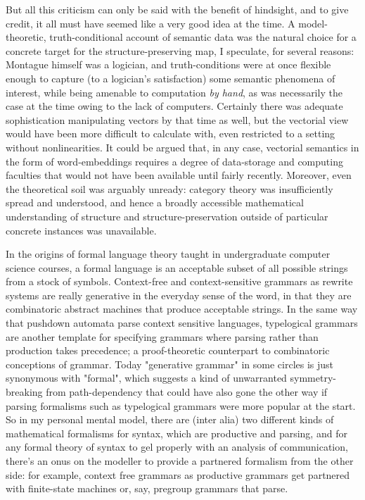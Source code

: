 But all this criticism can only be said with the benefit of hindsight, and to give credit, it all must have seemed like a very good idea at the time. A model-theoretic, truth-conditional account of semantic data was the natural choice for a concrete target for the structure-preserving map, I speculate, for several reasons: Montague himself was a logician, and truth-conditions were at once flexible enough to capture (to a logician's satisfaction) some semantic phenomena of interest, while being amenable to computation \emph{by hand}, as was necessarily the case at the time owing to the lack of computers. Certainly there was adequate sophistication manipulating vectors by that time as well, but the vectorial view would have been more difficult to calculate with, even restricted to a setting without nonlinearities. It could be argued that, in any case, vectorial semantics in the form of word-embeddings requires a degree of data-storage and computing faculties that would not have been available until fairly recently. Moreover, even the theoretical soil was arguably unready: category theory was insufficiently spread and understood, and hence a broadly accessible mathematical understanding of structure and structure-preservation outside of particular concrete instances was unavailable.


In the origins of formal language theory taught in undergraduate computer science courses, a formal language is an acceptable subset of all possible strings from a stock of symbols. Context-free and context-sensitive grammars as rewrite systems are really generative in the everyday sense of the word, in that they are combinatoric abstract machines that produce acceptable strings. In the same way that pushdown automata parse context sensitive languages, typelogical grammars are another template for specifying grammars where parsing rather than production takes precedence; a proof-theoretic counterpart to combinatoric conceptions of grammar. Today "generative grammar" in some circles is just synonymous with "formal", which suggests a kind of unwarranted symmetry-breaking from path-dependency that could have also gone the other way if parsing formalisms such as typelogical grammars were more popular at the start. So in my personal mental model, there are (inter alia) two different kinds of mathematical formalisms for syntax, which are productive and parsing, and for any formal theory of syntax to gel properly with an analysis of communication, there's an onus on the modeller to provide a partnered formalism from the other side: for example, context free grammars as productive grammars get partnered with finite-state machines or, say, pregroup grammars that parse.\\

